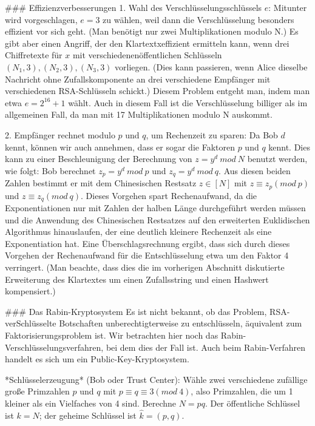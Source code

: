 \documentclass[a4paper]{article}
\begin{document}
\begin{multicols}{3}
{{{{        ### Effizienzverbesserungen
        1. Wahl des Verschlüsselungsschlüssels $e$:
        Mitunter wird vorgeschlagen, $e=3$ zu wählen, weil dann die Verschlüsselung besonders effizient vor sich geht. (Man benötigt nur zwei Multiplikationen modulo N.) Es gibt aber einen Angriff, der den Klartextxeffizient ermitteln kann, wenn drei Chiffretexte für $x$ mit verschiedenenöffentlichen Schlüsseln $(N_1,3),(N_2,3),(N_3,3)$ vorliegen. (Dies kann passieren, wenn Alice dieselbe Nachricht ohne Zufallskomponente an drei verschiedene Empfänger mit verschiedenen RSA-Schlüsseln schickt.)
        Diesem Problem entgeht man, indem man etwa $e=2^{16}+1$ wählt. Auch in diesem Fall ist die Verschlüsselung billiger als im allgemeinen Fall, da man mit 17 Multiplikationen modulo N auskommt.

        2. Empfänger rechnet modulo $p$ und $q$, um Rechenzeit zu sparen: Da Bob $d$ kennt, können wir auch annehmen, dass er sogar die Faktoren $p$ und $q$ kennt. Dies kann zu einer Beschleunigung der Berechnung von $z=y^d\ mod\ N$ benutzt werden, wie folgt: Bob berechnet $z_p=y^d\ mod\ p$ und $z_q=y^d\ mod\ q$. Aus diesen beiden Zahlen bestimmt er mit dem Chinesischen Restsatz $z\in [N]$ mit $z\equiv z_p (mod\ p)$ und $z\equiv z_q(mod\ q)$. Dieses Vorgehen spart Rechenaufwand, da die Exponentiationen nur mit Zahlen der halben Länge durchgeführt werden müssen und die Anwendung des Chinesischen Restsatzes auf den erweiterten Euklidischen Algorithmus hinauslaufen, der eine deutlich kleinere Rechenzeit als eine Exponentiation hat.
        Eine Überschlagsrechnung ergibt, dass sich durch dieses Vorgehen der Rechenaufwand für die Entschlüsselung etwa um den Faktor 4 verringert. (Man beachte, dass dies die im vorherigen Abschnitt diskutierte Erweiterung des Klartextes um einen Zufallsstring und einen Hashwert kompensiert.)

        ### Das Rabin-Kryptosystem
        Es ist nicht bekannt, ob das Problem, RSA-verSchlüsselte Botschaften unberechtigterweise zu entschlüsseln, äquivalent zum Faktorisierungsproblem ist. Wir betrachten hier noch das Rabin-Verschlüsselungsverfahren, bei dem dies der Fall ist. Auch beim Rabin-Verfahren handelt es sich um ein Public-Key-Kryptosystem.

        *Schlüsselerzeugung* (Bob oder Trust Center): Wähle zwei verschiedene zufällige große Primzahlen $p$ und $q$ mit $p\equiv q\equiv 3 (mod\ 4)$, also Primzahlen, die um 1 kleiner als ein Vielfaches von 4 sind. Berechne $N=pq$. Der öffentliche Schlüssel ist $k=N$; der geheime Schlüssel ist $\hat{k}= (p,q)$.

}}}}
\end{multicols}
\end{document}
